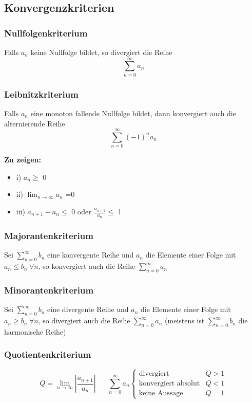 \documentclass[8pt, a4paper, landscape, fleqn]{scrartcl}
\newenvironment {annotation}[1]
				{\begin{itshape} \begin{small} \textbf{#1} \begin{itemize}}
				{\end{itemize} \end{small} \end{itshape}}
\begin{document}
\begin{multicols*}{3}
			\subsection{Konvergenzkriterien}
				\subsubsection{Nullfolgenkriterium}
					Falls $a_n$ keine Nullfolge bildet, so divergiert die Reihe \[\sum_{n=0}^{\infty}a_n\]
				\subsubsection{Leibnitzkriterium}
					Falls $a_n$ eine monoton fallende Nullfolge bildet, dann konvergiert auch die alternierende Reihe \[\sum_{n=0}^{\infty} (-1)^n a_n\]
					\begin{annotation}{Zu zeigen:}
						\item[i)] $a_n \ge$ 0
						\item[ii)] $\lim_{n\rightarrow \infty} a_n$ =0
						\item[iii)] $a_{n+1} - a_n \le$ 0 oder $\frac{a_{n+1}}{a_n} \le $ 1
					\end{annotation}
					
					
				\subsubsection{Majorantenkriterium}
					Sei $\sum_{n=0}^{\infty}b_n$ eine konvergente Reihe und $a_n$ die Elemente einer Folge mit $a_n \le b_n \hspace{3pt} \forall n$, so konvergiert auch die Reihe $\sum_{n=0}^{\infty} a_n$
				\subsubsection{Minorantenkriterium}
					Sei $\sum_{n=0}^{\infty}b_n$ eine divergente Reihe und $a_n$ die Elemente einer Folge mit $a_n \ge b_n \hspace{3pt} \forall n$, so divergiert auch die Reihe $\sum_{n=0}^{\infty} a_n$ (meistens ist $\sum_{n=0}^{\infty}b_n$ die harmonische Reihe)
				\subsubsection{Quotientenkriterium}
					\vspace{-10pt}
					\begin{equation*}
						Q=\lim_{n\rightarrow \infty} \left \vert\frac{a_{n+1}}{a_n}\right \vert \hspace{20pt} \sum_{n=0}^{\infty}a_n
						\begin{cases}
							\text{divergiert} \hspace{5pt} &Q>1\\
							\text{konvergiert absolut} &Q<1\\
							\text{keine Aussage} &Q=1
						\end{cases}
					\end{equation*}

\end{multicols*}
\end{document}
